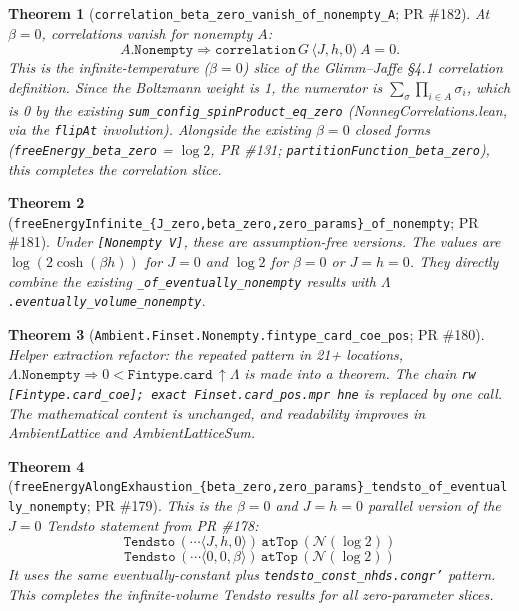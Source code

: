 \documentclass[a4paper,11pt]{article}
\newtheorem{theorem}{Theorem}
\newcommand{\LeanLambda}{\texorpdfstring{\ensuremath{\Lambda}}{Lambda}}
\begin{document}
\begin{theorem}[\texttt{correlation\_beta\_zero\_vanish\_of\_nonempty\_A}; PR \#182]
At $\beta = 0$, correlations vanish for nonempty $A$:
\[
  A.\texttt{Nonempty} \Rightarrow
    \texttt{correlation}\,G\,\langle J, h, 0\rangle\,A = 0.
\]
This is the infinite-temperature ($\beta = 0$) slice of the Glimm--Jaffe
\S 4.1 correlation definition. Since the Boltzmann weight is 1, the
numerator is $\sum_\sigma \prod_{i \in A} \sigma_i$, which is 0 by the
existing \texttt{sum\_config\_spinProduct\_eq\_zero}
(NonnegCorrelations.lean, via the \texttt{flipAt} involution). Alongside the
existing $\beta = 0$ closed forms
(\texttt{freeEnergy\_beta\_zero} = $\log 2$, PR \#131;
\texttt{partitionFunction\_beta\_zero}), this completes the correlation
slice.
\end{theorem}

\begin{theorem}[\texttt{freeEnergyInfinite\_\{J\_zero,beta\_zero,zero\_params\}\_of\_nonempty}; PR \#181]
Under \texttt{[Nonempty V]}, these are assumption-free versions. The values
are $\log(2 \cosh(\beta h))$ for $J=0$ and $\log 2$ for $\beta=0$ or
$J=h=0$. They directly combine the existing
\texttt{\_of\_eventually\_nonempty} results with
\texttt{\LeanLambda.eventually\_volume\_nonempty}.
\end{theorem}

\begin{theorem}[\texttt{Ambient.Finset.Nonempty.fintype\_card\_coe\_pos}; PR \#180]
Helper extraction refactor: the repeated pattern in 21+ locations,
$\Lambda.\texttt{Nonempty} \Rightarrow 0 < \texttt{Fintype.card}\,\uparrow\Lambda$
is made into a theorem. The chain
\texttt{rw [Fintype.card\_coe]; exact Finset.card\_pos.mpr hne} is replaced
by one call. The mathematical content is unchanged, and readability improves
in AmbientLattice and AmbientLatticeSum.
\end{theorem}

\begin{theorem}[\texttt{freeEnergyAlongExhaustion\_\{beta\_zero,zero\_params\}\_tendsto\_of\_eventually\_nonempty}; PR \#179]
This is the $\beta=0$ and $J=h=0$ parallel version of the $J=0$ Tendsto
statement from PR \#178:
\[
  \texttt{Tendsto}\,(\cdots \langle J, h, 0\rangle)\,\texttt{atTop}\,(\mathcal N(\log 2))
\]
\[
  \texttt{Tendsto}\,(\cdots \langle 0, 0, \beta\rangle)\,\texttt{atTop}\,(\mathcal N(\log 2))
\]
It uses the same eventually-constant plus
\texttt{tendsto\_const\_nhds.congr'} pattern. This completes the
infinite-volume Tendsto results for all zero-parameter slices.
\end{theorem}
\end{document}

